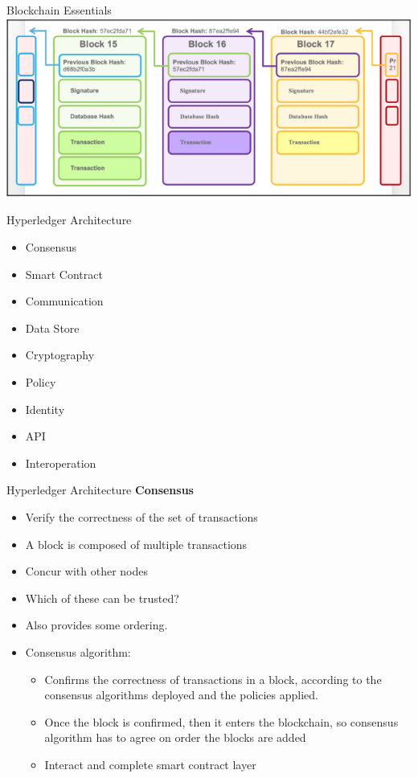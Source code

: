 \documentclass[pdf,table]{beamer}
\begin{document}
\begin{frame}{Blockchain Essentials}
	\includegraphics[scale=0.5]{blocks}

\end{frame}

\begin{frame}{Hyperledger Architecture \cite{hyperledger:1}}
\begin{itemize}
	\item Consensus 
	\item Smart Contract 
	\item Communication
	\item Data Store
	\item Cryptography
	\item Policy
	\item Identity
	\item API
	\item Interoperation
\end{itemize}
\end{frame}

\begin{frame}{Hyperledger Architecture \cite{hyperledger:1}}
	{\bf Consensus}
\begin{itemize}
	\item Verify the correctness of the set of transactions
	\item A block is composed of multiple transactions
	\item Concur with other nodes
	\item Which of these can be trusted?
	\item Also provides some ordering.
	\item Consensus algorithm:
		\begin{itemize} \pause
			\item Confirms the correctness of transactions in a block, according to the consensus algorithms deployed and the policies applied.
			\item Once the block is confirmed, then it enters the blockchain, so consensus algorithm has to agree on order the blocks are added
			\item Interact and complete smart contract layer 
		\end{itemize}
\end{itemize}
\end{frame}
\end{document}
